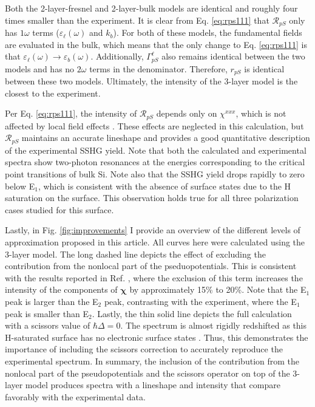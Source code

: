 Both the 2-layer-fresnel and 2-layer-bulk models are identical and roughly four times smaller than the experiment. It is clear from Eq. \eqref{eq:rps111} that $\mathcal{R}_{pS}$ only has $1\omega$ terms ($\varepsilon_{\ell}(\omega)$ and $k_{b}$). For both of these models, the fundamental fields are evaluated in the bulk, which means that the only change to Eq. \eqref{eq:rps111} is that $\varepsilon_{\ell}(\omega) \rightarrow \varepsilon_{b}(\omega)$. Additionally, $\Gamma^{\ell}_{pS}$ also remains identical between the two models and has no $2\omega$ terms in the denominator. Therefore, $r_{pS}$ is identical between these two models. Ultimately, the intensity of the 3-layer model is the closest to the experiment.

Per Eq. \eqref{eq:rps111}, the intensity of $\mathcal{R}_{pS}$ depends only on $\chi^{xxx}$, which is not affected by local field effects \cite{tancognedejean:tel-01235611}. These effects are neglected in this calculation, but $\mathcal{R}_{pS}$ maintains an accurate lineshape and provides a good quantitative description of the experimental SSHG yield. Note that both the calculated and experimental spectra show two-photon resonances at the energies corresponding to the critical point transitions of bulk Si. Note also that the SSHG yield drops rapidly to zero below E$_{1}$, which is consistent with the absence of surface states due to the H saturation on the surface. This observation holds true for all three polarization cases studied for this surface.

Lastly, in Fig. \ref{fig:improvements} I provide an overview of the different levels of approximation proposed in this article. All curves here were calculated using the 3-layer model. The long dashed line depicts the effect of excluding the contribution from the nonlocal part of the pseduopotentials. This is consistent with the results reported in Ref. \cite{andersonPRB15}, where the exclusion of this term increases the intensity of the components of $\boldsymbol{\chi}$ by approximately 15\% to 20\%. Note that the E$_{1}$ peak is larger than the E$_{2}$ peak, contrasting with the experiment, where the E$_{1}$ peak is smaller than E$_{2}$. Lastly, the thin solid line depicts the full calculation with a scissors value of $\hbar\Delta = 0$. The spectrum is almost rigidly redshifted as this H-saturated surface has no electronic surface states \cite{andersonPRB15}. Thus, this demonstrates the importance of including the scissors correction to accurately reproduce the experimental spectrum. In summary, the inclusion of the contribution from the nonlocal part of the pseudopotentials and the scissors operator on top of the 3-layer model produces spectra with a lineshape and intensity that compare favorably with the experimental data.

